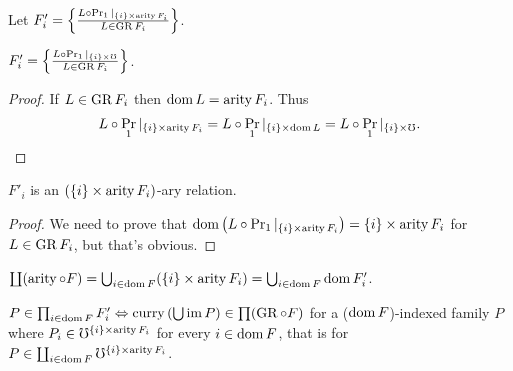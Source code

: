 Let $F'_{i}=\left\{ \frac{L\circ\Pr_{1}|_{\{i\}\times\operatorname{arity} F_{i}}}{L\in\operatorname{GR} F_{i}}\right\}$.
\begin{prop}
$F'_{i}=\left\{ \frac{L\circ\Pr_{1}|_{\{i\}\times\mho}}{L\in\operatorname{GR} F_{i}}\right\}$.\end{prop}
\begin{proof}
If $L\in\operatorname{GR} F_{i}$ then $\operatorname{dom} L=\operatorname{arity} F_{i}$. Thus
\[
L\circ\Pr_{1}|_{\{i\}\times\operatorname{arity} F_{i}}=L\circ\Pr_{1}|_{\{i\}\times\operatorname{dom} L}=L\circ\Pr_{1}|_{\{i\}\times\mho}.
\]
\end{proof}
\begin{prop}
$F'_{i}$ is an $(\{i\}\times\operatorname{arity} F_{i})$-ary relation.\end{prop}
\begin{proof}
We need to prove that $\operatorname{dom}\left(L\circ\Pr_{1}|_{\{i\}\times\operatorname{arity} F_{i}}\right)=\{i\}\times\operatorname{arity} F_{i}$
for $L\in\operatorname{GR} F_{i}$, but that's obvious.\end{proof}
\begin{obvious}
$\coprod(\operatorname{arity}\circ F)=\bigcup_{i\in\operatorname{dom} F}(\{i\}\times\operatorname{arity} F_{i})=\bigcup_{i\in\operatorname{dom} F}\operatorname{dom} F'_{i}$.\end{obvious}
\begin{lem}
$P\in\prod_{i\in\operatorname{dom} F}F'_{i}\Leftrightarrow\operatorname{curry}\left(\bigcup\operatorname{im} P\right)\in\prod(\operatorname{GR}\circ F)$
for a ($\operatorname{dom} F$)-indexed family $P$ where $P_{i}\in\mho^{\{i\}\times\operatorname{arity} F_{i}}$
for every $i\in\operatorname{dom} F$, that is for $P\in\coprod_{i\in\operatorname{dom} F}\mho^{\{i\}\times\operatorname{arity} F_{i}}$.\end{lem}

